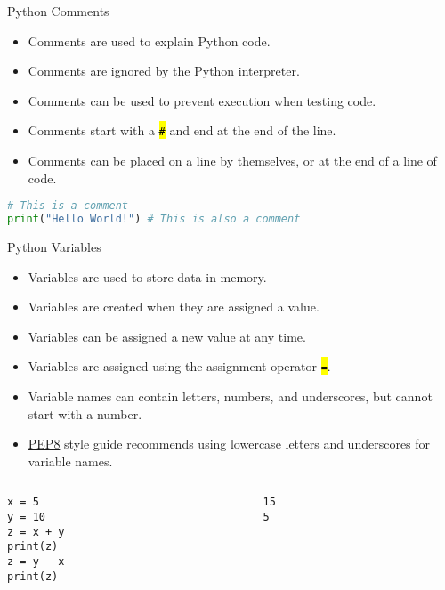 \documentclass[
    aspectratio=169, 
    usepdftitle=false, 
    xcolor={dvipsnames},
    hyperref={
        colorlinks,
        linkcolor=black,
        urlcolor=blue}
    ]{beamer}
\let\OldTexttt\texttt
\renewcommand{\texttt}[1]{\OldTexttt{\hl{#1}}}%
\begin{document}
\begin{frame}[fragile]{Python Comments}
    \begin{itemize}
        \item Comments are used to explain Python code.
        \item Comments are ignored by the Python interpreter.
        \item Comments can be used to prevent execution when testing code.
        \item Comments start with a \texttt{\#} and end at the end of the line.
        \item Comments can be placed on a line by themselves, or at the end of a line of code.
    \end{itemize}
    \begin{lstlisting}[language=Python]
# This is a comment
print("Hello World!") # This is also a comment
    \end{lstlisting}
\end{frame}


\begin{frame}[fragile]{Python Variables}
    \begin{itemize}
        \item Variables are used to store data in memory.
        \item Variables are created when they are assigned a value.
        \item Variables can be assigned a new value at any time.
        \item Variables are assigned using the assignment operator \texttt{=}.
        \item Variable names can contain letters, numbers, and underscores, but cannot start with a number.
        \item \href{https://peps.python.org/pep-0008/}{PEP8} style guide recommends using lowercase letters and underscores for variable names.
    \end{itemize}
    \begin{columns}
        \begin{column}{0.5\textwidth}
            \begin{lstlisting}
x = 5
y = 10
z = x + y
print(z)
z = y - x
print(z)
    \end{lstlisting}
        \end{column}
        \begin{column}{0.4\textwidth}
\begin{lstlisting}[style=output]
15
5
\end{lstlisting}
        \end{column}
    \end{columns}
\end{frame}
\end{document}
